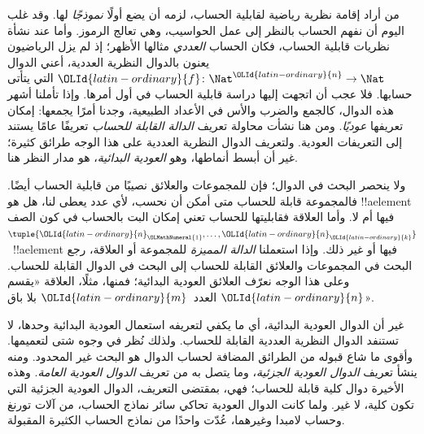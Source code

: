 \documentclass[../../../include/open-logic-section]{subfiles}
\begin{document}

من أراد إقامة نظرية رياضية لقابلية الحساب، لزمه أن يضع أولًا \emph{نموذجًا}
لها. وقد غلب اليوم أن نفهم الحساب بالنظر إلى عمل
الحواسيب، وهي تعالج الرموز. وأما عند نشأة نظريات قابلية الحساب، فكان
الحساب \emph{العددي} مثالها الأظهر؛ إذ لم يزل
الرياضيون يعنون بالدوال النظرية العددية، أعني الدوال
${\OLId{latin-ordinary}{f}}\colon \Nat^{\OLId{latin-ordinary}{n}} \to \Nat$ التي يتأتى حسابها. فلا عجب أن اتجهت
إليها دراسة قابلية الحساب في أول أمرها. وإذا تأملنا أشهر
هذه الدوال، كالجمع والضرب والأس في الأعداد الطبيعية،
وجدنا أمرًا يجمعها: إمكان تعريفها \emph{عوديًا}. ومن هنا نشأت محاولة
تعريف \emph{الدالة القابلة للحساب} تعريفًا عامًا يستند إلى التعريفات العودية.
ولتعريف الدوال النظرية العددية على هذا الوجه طرائق كثيرة؛ غير أن
أبسط أنماطها، وهو \emph{العودية البدائية}، هو مدار النظر هنا.

ولا ينحصر البحث في الدوال؛ فإن للمجموعات والعلائق نصيبًا من قابلية
الحساب أيضًا. فالمجموعة قابلة للحساب متى أمكن أن نحسب، لأي عدد يعطى لنا، هل
هو !!a{element} فيها أم لا. وأما العلاقة فقابليتها للحساب
تعني إمكان البت بالحساب في كون الصف
$\tuple{{\OLId{latin-ordinary}{n}}_{\OLMathNumeral{1}},\dots,{\OLId{latin-ordinary}{n}}_{\OLId{latin-ordinary}{k}}}$~!!a{element} فيها أو غير ذلك. وإذا استعملنا
\emph{الدالة المميزة} للمجموعة أو العلاقة، رجع البحث في المجموعات
والعلائق القابلة للحساب إلى البحث في الدوال القابلة للحساب. وعلى هذا الوجه
نعرّف العلائق العودية البدائية؛ فمنها، مثلًا، العلاقة «يقسم ${\OLId{latin-ordinary}{n}}$ العدد~${\OLId{latin-ordinary}{m}}$
بلا باق».

غير أن الدوال العودية البدائية، أي ما يكفي لتعريفه استعمال العودية
البدائية وحدها، لا تستنفد الدوال النظرية العددية القابلة للحساب. ولذلك
نُظر في وجوه شتى لتعميمها. وأقوى ما شاع قبوله من الطرائق المضافة
لحساب الدوال هو البحث غير المحدود. ومنه ينشأ تعريف
\emph{الدوال العودية الجزئية}، وما يتصل به من تعريف \emph{الدوال
العودية العامة}. وهذه الأخيرة دوال كلية قابلة للحساب؛ فهي، بمقتضى التعريف،
الدوال العودية الجزئية التي تكون كلية، لا غير. ولما كانت الدوال
العودية تحاكي سائر نماذج الحساب، من آلات تورنغ وحساب لامبدا وغيرهما،
عُدّت واحدًا من نماذج الحساب الكثيرة المقبولة.
\end{document}
